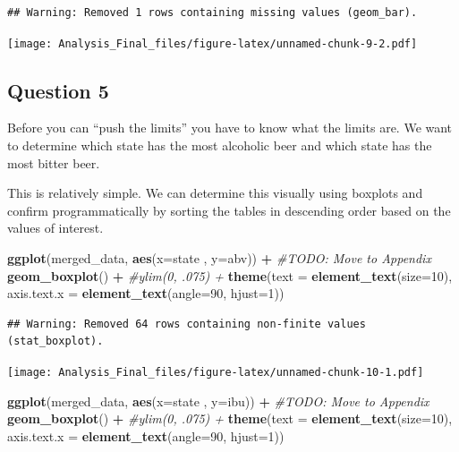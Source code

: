 \documentclass[]{article}
\newenvironment{Shaded}{\begin{snugshade}}{\end{snugshade}}
\newcommand{\KeywordTok}[1]{\textcolor[rgb]{0.13,0.29,0.53}{\textbf{#1}}}
\newcommand{\DataTypeTok}[1]{\textcolor[rgb]{0.13,0.29,0.53}{#1}}
\newcommand{\DecValTok}[1]{\textcolor[rgb]{0.00,0.00,0.81}{#1}}
\newcommand{\StringTok}[1]{\textcolor[rgb]{0.31,0.60,0.02}{#1}}
\newcommand{\CommentTok}[1]{\textcolor[rgb]{0.56,0.35,0.01}{\textit{#1}}}
\newcommand{\OperatorTok}[1]{\textcolor[rgb]{0.81,0.36,0.00}{\textbf{#1}}}
\newcommand{\NormalTok}[1]{#1}
\begin{document}
\begin{verbatim}
## Warning: Removed 1 rows containing missing values (geom_bar).
\end{verbatim}

\texttt{[image: Analysis\_Final\_files/figure-latex/unnamed-chunk-9-2.pdf]}

\subsection{Question 5}\label{question-5}

Before you can ``push the limits'' you have to know what the limits are.
We want to determine which state has the most alcoholic beer and which
state has the most bitter beer.

This is relatively simple. We can determine this visually using boxplots
and confirm programmatically by sorting the tables in descending order
based on the values of interest.

\begin{Shaded}
\begin{Highlighting}[]
\KeywordTok{ggplot}\NormalTok{(merged_data, }\KeywordTok{aes}\NormalTok{(}\DataTypeTok{x=}\NormalTok{state , }\DataTypeTok{y=}\NormalTok{abv)) }\OperatorTok{+}\StringTok{  }\CommentTok{#TODO: Move to Appendix}
\StringTok{  }\KeywordTok{geom_boxplot}\NormalTok{() }\OperatorTok{+}
\StringTok{  }\CommentTok{#ylim(0, .075) +}
\StringTok{  }\KeywordTok{theme}\NormalTok{(}\DataTypeTok{text =} \KeywordTok{element_text}\NormalTok{(}\DataTypeTok{size=}\DecValTok{10}\NormalTok{),}
        \DataTypeTok{axis.text.x =} \KeywordTok{element_text}\NormalTok{(}\DataTypeTok{angle=}\DecValTok{90}\NormalTok{, }\DataTypeTok{hjust=}\DecValTok{1}\NormalTok{)) }
\end{Highlighting}
\end{Shaded}

\begin{verbatim}
## Warning: Removed 64 rows containing non-finite values (stat_boxplot).
\end{verbatim}

\texttt{[image: Analysis\_Final\_files/figure-latex/unnamed-chunk-10-1.pdf]}

\begin{Shaded}
\begin{Highlighting}[]
\KeywordTok{ggplot}\NormalTok{(merged_data, }\KeywordTok{aes}\NormalTok{(}\DataTypeTok{x=}\NormalTok{state , }\DataTypeTok{y=}\NormalTok{ibu)) }\OperatorTok{+}\StringTok{  }\CommentTok{#TODO: Move to Appendix}
\StringTok{  }\KeywordTok{geom_boxplot}\NormalTok{() }\OperatorTok{+}
\StringTok{  }\CommentTok{#ylim(0, .075) +}
\StringTok{  }\KeywordTok{theme}\NormalTok{(}\DataTypeTok{text =} \KeywordTok{element_text}\NormalTok{(}\DataTypeTok{size=}\DecValTok{10}\NormalTok{),}
        \DataTypeTok{axis.text.x =} \KeywordTok{element_text}\NormalTok{(}\DataTypeTok{angle=}\DecValTok{90}\NormalTok{, }\DataTypeTok{hjust=}\DecValTok{1}\NormalTok{)) }
\end{Highlighting}
\end{Shaded}
\end{document}
